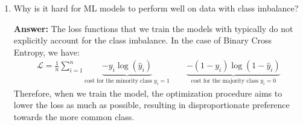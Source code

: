 \documentclass{article}
\newenvironment{QandA}{\begin{enumerate}[label=\arabic*.]}{\end{enumerate}}
\newenvironment{InnerQandA}{\begin{enumerate}[label=\roman*.]}{\end{enumerate}}
\newenvironment{answer}{\par\normalfont \textbf{Answer:}}{}
\begin{document}
\begin{QandA}
\begin{InnerQandA}
\begin{answer}
            (Source: \href{https://en.wikipedia.org/wiki/Accuracy_paradox}{Wikipedia})
        \end{answer}

        \item Why is it hard for ML models to perform well on data with class imbalance?
        \begin{answer}
            The loss functions that we train the models with typically do not explicitly account for the class imbalance. In the case of Binary Cross Entropy, we have:
            \begin{align*}
                \mathcal{L} = \frac{1}{n} \sum_{i=1}^n \underbrace{-y_i \log (\hat{y}_i)}_{\text{cost for the minority class } y_i = 1} \quad \quad \underbrace{-(1 - y_i)\log(1 - \hat{y}_i)}_{\text{cost for the majority class } y_i = 0}
            \end{align*}
            Therefore, when we train the model, the optimization procedure aims to lower the loss as much as possible, resulting in disproportionate preference towards the more common class.
        \end{answer}


\end{InnerQandA}
\end{QandA}
\end{document}
